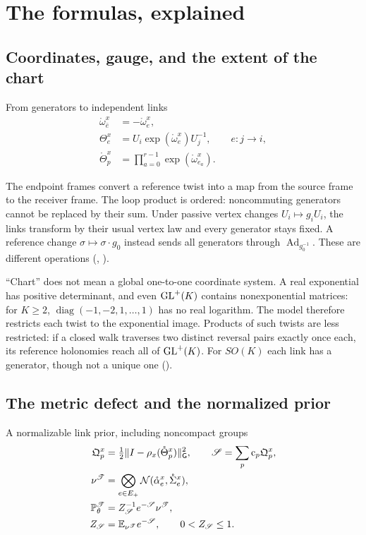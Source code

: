 \section{The formulas, explained}
\label{comp:links-formulas}

\subsection{Coordinates, gauge, and the extent of the chart}

\begin{keyequation}{From generators to independent links}
\[
\begin{aligned}
\mathring\omega^x_{\bar e}&=-\mathring\omega^x_e,\\
\Theta^x_e&=U_i\exp(\mathring\omega^x_e)U_j^{-1},\qquad e:j\to i,\\
\mathring\Theta^x_p&=\prod_{a=0}^{r-1}\exp(\mathring\omega^x_{e_a}).
\end{aligned}
\]
\end{keyequation}

The endpoint frames convert a reference twist into a map from the source frame to the receiver
frame. The loop product is ordered: noncommuting generators cannot be replaced by their sum.
Under passive vertex changes $U_i\mapsto g_iU_i$, the links transform by their usual vertex law
and every generator stays fixed. A reference change $\sigma\mapsto\sigma\cdot g_0$ instead
sends all generators through $\operatorname{Ad}_{g_0^{-1}}$. These are different operations
(, ).

``Chart'' does not mean a global one-to-one coordinate system. A real exponential has positive
determinant, and even $\mathrm{GL}^+(K)$ contains nonexponential matrices: for $K\geq2$,
$\operatorname{diag}(-1,-2,1,\ldots,1)$ has no real logarithm. The model therefore restricts
each twist to the exponential image. Products of such twists are less restricted: if a closed
walk traverses two distinct reversal pairs exactly once each, its reference holonomies reach
all of $\mathrm{GL}^+(K)$. For $SO(K)$ each link has a generator, though not a unique one
().

\subsection{The metric defect and the normalized prior}

\begin{keyequation}{A normalizable link prior, including noncompact groups}
\[
\begin{aligned}
\mathfrak Q^x_p&=\tfrac12\lVert I-\rho_x(\mathring\Theta^x_p)\rVert_{\mathsf G}^2,
\qquad\mathscr S=\sum_p\mathrm c_p\mathfrak Q^x_p,\\
\nu^{\mathscr T}&=\bigotimes_{e\in E_+}\mathcal N(\mathring\alpha^x_e,\mathring\Sigma^x_e),\\
\mathbb P^{\mathscr T}_\theta&=Z_{\mathscr S}^{-1}e^{-\mathscr S}\nu^{\mathscr T},\\
Z_{\mathscr S}&=\mathbb E_{\nu^{\mathscr T}}e^{-\mathscr S},\qquad0<Z_{\mathscr S}\leq1.
\end{aligned}
\]
\end{keyequation}

